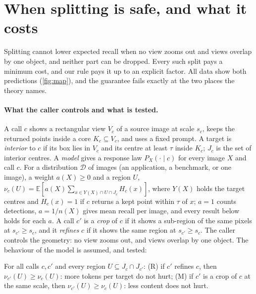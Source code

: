 \section{When splitting is safe, and what it costs}
\label{sec:safe}

Splitting cannot lower expected recall when no view zooms out and views overlap by one object, and neither part can be dropped. Every such split pays a minimum cost, and our rule pays it up to an explicit factor. All data show both predictions (\cref{fig:map}), and the guarantee fails exactly at the two places the theory names.

\paragraph{What the caller controls and what is tested.} A call $c$ shows a rectangular view $V_c$ of a source image at scale $s_c$, keeps the returned points inside a core $K_c \subseteq V_c$, and uses a fixed prompt. A target is \emph{interior} to $c$ if its box lies in $V_c$ and its centre at least $\tau$ inside $K_c$; $J_c$ is the set of interior centres. A \emph{model} gives a response law $P_X(\cdot \mid c)$ for every image $X$ and call $c$. For a distribution $\mathcal{D}$ of images (an application, a benchmark, or one image), a weight $a(X) \ge 0$ and a region $U$, $\nu_c(U) = \mathbb{E}[a(X) \sum_{x \in Y(X) \cap U \cap J_c} H_c(x)]$, where $Y(X)$ holds the target centres and $H_c(x) = 1$ if $c$ returns a kept point within $\tau$ of $x$; $a = 1$ counts detections, $a = 1/n(X)$ gives mean recall per image, and every result below holds for each $a$. A call $c'$ is a \emph{crop} of $c$ if it shows a sub-region of the same pixels at $s_{c'} \ge s_c$, and it \emph{refines} $c$ if it shows the same region at $s_{c'} \ge s_c$. The caller controls the geometry: no view zooms out, and views overlap by one object. The behaviour of the model is assumed, and tested:

\par\noindent\begin{minipage}{\linewidth}
\begin{assumption}[Monotonicity]
\label{ass:mono}
For all calls $c, c'$ and every region $U \subseteq J_c \cap J_{c'}$: (R) if $c'$ refines $c$, then $\nu_{c'}(U) \ge \nu_c(U)$: more tokens per target do not hurt; (M) if $c'$ is a crop of $c$ at the same scale, then $\nu_{c'}(U) \ge \nu_c(U)$: less content does not hurt.
\end{assumption}
\end{minipage}

